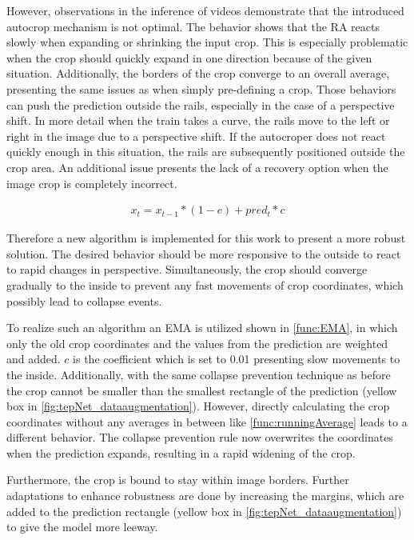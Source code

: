 \noindent However, observations in the inference of videos demonstrate that the introduced autocrop mechanism is not optimal. The behavior shows that the \ac{RA} reacts slowly when expanding or shrinking the input crop. This is especially problematic when the crop should quickly expand in one direction because of the given situation. Additionally, the borders of the crop converge to an overall average, presenting the same issues as when simply pre-defining a crop. Those behaviors can push the prediction outside the rails, especially in the case of a perspective shift. In more detail when the train takes a curve, the rails move to the left or right in the image due to a perspective shift. If the autocroper does not react quickly enough in this situation, the rails are subsequently positioned outside the crop area. An additional issue presents the lack of a recovery option when the image crop is completely incorrect.

\begin{align}
    x_t =  x_{t-1} * (1 - c) + pred_t * c
    \label{func:EMA}
\end{align}

\vspace{0.7cm}

\noindent Therefore a new algorithm is implemented for this work to present a more robust solution.
The desired behavior should be more responsive to the outside to react to rapid changes in perspective.
Simultaneously, the crop should converge gradually to the inside to prevent any fast movements of crop coordinates, which possibly lead to collapse events.

To realize such an algorithm an \ac{EMA} is utilized shown in \autoref{func:EMA}, in which only the old crop coordinates and the values from the prediction are weighted and added.
$c$ is the coefficient which is set to 0.01 presenting slow movements to the inside.
Additionally, with the same collapse prevention technique as before the crop cannot be smaller than the smallest rectangle of the prediction (yellow box in \autoref{fig:tepNet_dataaugmentation}).
However, directly calculating the crop coordinates without any averages in between like \autoref{func:runningAverage} leads to a different behavior.
The collapse prevention rule now overwrites the coordinates when the prediction expands, resulting in a rapid widening of the crop.

Furthermore, the crop is bound to stay within image borders.
Further adaptations to enhance robustness are done by increasing the margins, which are added to the prediction rectangle (yellow box in \autoref{fig:tepNet_dataaugmentation}) to give the model more leeway.

